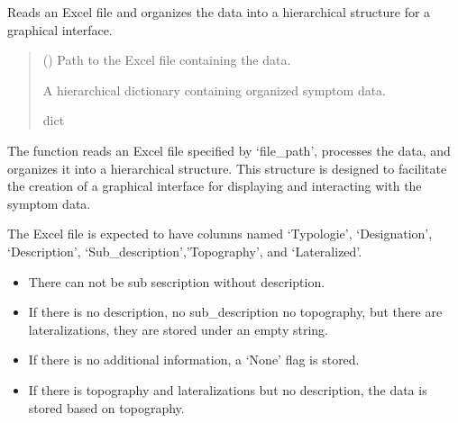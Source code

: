 \documentclass[letterpaper,10pt,english]{sphinxmanual}
\begin{document}
\begin{fulllineitems}
\label{\detokenize{annotation:annotation.exel_menus.Read_excel}}
\pysigstartsignatures
{}
\pysigstopsignatures
\sphinxAtStartPar
Reads an Excel file and organizes the data into a hierarchical structure for a graphical interface.
\begin{quote}\begin{description}
\sphinxAtStartPar
{} () \textendash{} Path to the Excel file containing the data.

\sphinxAtStartPar
A hierarchical dictionary containing organized symptom data.

\sphinxAtStartPar
dict

\end{description}\end{quote}

\sphinxAtStartPar
The function reads an Excel file specified by ‘file\_path’,
processes the data, and organizes it into a hierarchical structure.
This structure is designed to facilitate the creation of a graphical
interface for displaying and interacting with the symptom data.

\sphinxAtStartPar
The Excel file is expected to have columns named ‘Typologie’, ‘Designation’,
‘Description’, ‘Sub\_description’,’Topography’, and ‘Lateralized’.
\begin{description}
\begin{itemize}
\item {} 
\sphinxAtStartPar
There can not be sub sescription without description.

\item {} 
\sphinxAtStartPar
If there is no description, no sub\_description no topography, but there are lateralizations, they are stored under an empty string.

\item {} 
\sphinxAtStartPar
If there is no additional information, a ‘None’ flag is stored.

\item {} 
\sphinxAtStartPar
If there is topography and lateralizations but no description, the data is stored based on topography.


\end{itemize}
\end{description}
\end{fulllineitems}
\end{document}
